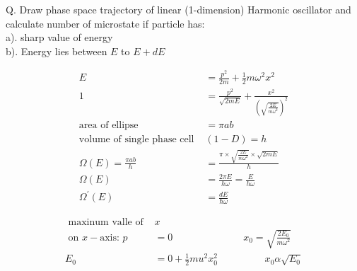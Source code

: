 Q. Draw phase space trajectory of linear (1-dimension) Harmonic oscillator and calculate number of microstate if particle has:\\
a). sharp value of energy\\
b). Energy lies between $E$ to $E+d E$
\begin{answer}
	\begin{align*}
	E&=\frac{p^{2}}{2 m}+\frac{1}{2} m \omega^2 x^{2}\\
	1&=\frac{p^{2}}{\sqrt{2 m E}}+\frac{x^{2}}{\left(\sqrt{\frac{2 E}{m \omega^2}}\right)^{2}}\\
	\text{area of ellipse }&=\pi a b\\
	\text{volume of single phase cell }&(1-D)=h\\
	\Omega(E)=\frac{\pi a b}{h}&=\frac{\pi \times \sqrt{\frac{2 E}{m \omega^2}}  \times \sqrt{2 m E}}{h}\\
	\Omega(E)&=\frac{2 \pi E}{h \omega}=\frac{E}{h \omega}\\
	\Omega^{\prime}(E)&=\frac{d E}{\hbar \omega}
	\end{align*}
\end{answer}
\begin{note}
	\begin{align*}
	\text{	maxinum valle of }&x \\
\text{	on }x-\text{axis: }p&=0 \hspace{3cm}x_{0}=\sqrt{\frac{2 E_{0}}{m \omega^{2}}}\\
	E_{0}&=0+\frac{1}{2} m u^{2} x_{0}^{2}\hspace{2cm}x_{0} \alpha \sqrt{E_{0}}\\
	\end{align*}
\end{note}





